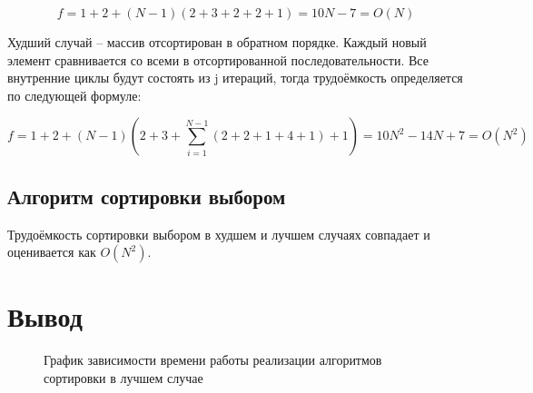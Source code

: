             \begin{equation}
                f = 1 + 2 + (N-1)(2 + 3 + 2 + 2 + 1) = 10N - 7 = O(N)
            \end{equation}

            Худший случай -- массив отсортирован в обратном порядке. 
            Каждый новый элемент сравнивается со всеми в отсортированной последовательности.
            Все внутренние циклы будут состоять из j итераций, тогда
            трудоёмкость определяется по следующей формуле:

            \begin{equation}
                f = 1 + 2 + (N-1)(2 + 3 + \sum_{i=1}^{N-1} (2 + 2 + 1 + 4 + 1) + 1) = 10N^2 - 14N + 7 = O(N^2)
            \end{equation}

        \subsection{Алгоритм сортировки выбором}
            Трудоёмкость сортировки выбором в худшем и лучшем случаях совпадает
            и оценивается как $ O(N^2) $.
    \section{Вывод}
        


    \begin{figure}[h!]
        \centering
        \caption{График зависимости времени работы реализации алгоритмов сортировки в лучшем случае} 
        \label{graph:test:best}
    \end{figure}

